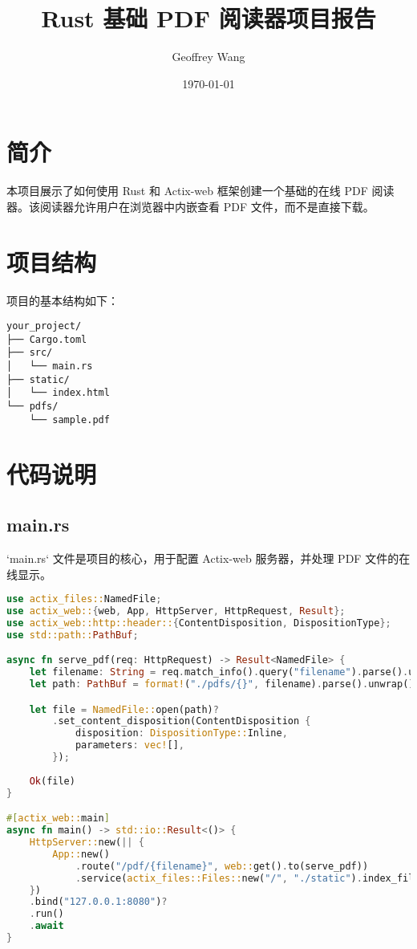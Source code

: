 \documentclass{article}
\title{Rust 基础 PDF 阅读器项目报告}
\author{Geoffrey Wang}
\date{\today}
\begin{document}
\maketitle

\section{简介}
本项目展示了如何使用 Rust 和 Actix-web 框架创建一个基础的在线 PDF 阅读器。该阅读器允许用户在浏览器中内嵌查看 PDF 文件，而不是直接下载。

\section{项目结构}
项目的基本结构如下：
\begin{verbatim}
your_project/
├── Cargo.toml
├── src/
│   └── main.rs
├── static/
│   └── index.html
└── pdfs/
    └── sample.pdf
\end{verbatim}

\section{代码说明}

\subsection{main.rs}
`main.rs` 文件是项目的核心，用于配置 Actix-web 服务器，并处理 PDF 文件的在线显示。

\begin{lstlisting}[language=rust, caption=main.rs]
use actix_files::NamedFile;
use actix_web::{web, App, HttpServer, HttpRequest, Result};
use actix_web::http::header::{ContentDisposition, DispositionType};
use std::path::PathBuf;

async fn serve_pdf(req: HttpRequest) -> Result<NamedFile> {
    let filename: String = req.match_info().query("filename").parse().unwrap();
    let path: PathBuf = format!("./pdfs/{}", filename).parse().unwrap();

    let file = NamedFile::open(path)?
        .set_content_disposition(ContentDisposition {
            disposition: DispositionType::Inline,
            parameters: vec![],
        });
    
    Ok(file)
}

#[actix_web::main]
async fn main() -> std::io::Result<()> {
    HttpServer::new(|| {
        App::new()
            .route("/pdf/{filename}", web::get().to(serve_pdf))
            .service(actix_files::Files::new("/", "./static").index_file("index.html"))
    })
    .bind("127.0.0.1:8080")?
    .run()
    .await
}
\end{lstlisting}
\end{document}
